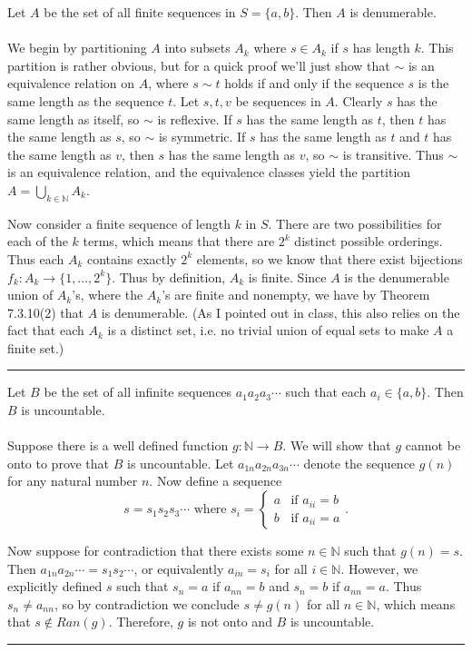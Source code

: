 \documentclass[11pt]{hmcpset}
\newenvironment{problem2}[1]{\noindent {\bf (#1}}
{\medskip}
\newenvironment{problem1}[1]{\noindent {\bf Problem #1}}
{\medskip}
\newenvironment{proof}{\noindent {\bf Proof:} \\}{\hfill
\rule{1mm}{3mm} \bigskip}
\begin{document}
\begin{problem1}{7 (a)} Let $A$ be the set of all finite sequences in $S=\{a,b\}$. Then $A$ is denumerable.\\
\begin{proof}\indent We begin by partitioning $A$ into subsets $A_k$ where $s\in A_k$ if $s$ has length $k$. This partition is rather obvious, but for a quick proof we'll just show that $\sim$ is an equivalence relation on $A$, where $s \sim t$ holds if and only if the sequence $s$ is the same length as the sequence $t$. Let $s,t,v$ be sequences in $A$. Clearly $s$ has the same length as itself, so $\sim$ is reflexive. If $s$ has the same length as $t$, then $t$ has the same length as $s$, so $\sim$ is symmetric. If $s$ has the same length as $t$ and $t$ has the same length as $v$, then $s$ has the same length as $v$, so $\sim$ is transitive. Thus $\sim$ is an equivalence relation, and the equivalence classes yield the partition $A=\bigcup_{k\in\mathbb{N}}A_k$.

Now consider a finite sequence of length $k$ in $S$. There are two possibilities for each of the $k$ terms, which means that there are $2^k$ distinct possible orderings. Thus each $A_k$ contains exactly $2^k$ elements, so we know that there exist bijections $f_k:A_k\to\{1,\ldots,2^k\}$. Thus by definition, $A_k$ is finite. Since $A$ is the denumerable union of $A_k$'s, where the $A_k$'s are finite and nonempty, we have by Theorem 7.3.10(2) that $A$ is denumerable. (As I pointed out in class, this also relies on the fact that each $A_k$ is a distinct set, i.e. no trivial union of equal sets to make $A$ a finite set.)
\end{proof}
\end{problem1}

\begin{problem2}{b)} Let $B$ be the set of all infinite sequences $a_1a_2a_3\cdots$ such that each $a_i\in \{a,b\}$. Then $B$ is uncountable.\\
\begin{proof}\indent Suppose there is a well defined function $g:\mathbb{N}\to B$. We will show that $g$ cannot be onto to prove that $B$ is uncountable. Let $a_{1n}a_{2n}a_{3n}\cdots$ denote the sequence $g(n)$ for any natural number $n$. Now define a sequence $$s=s_1s_2s_3\cdots\text{ where } s_i=\begin{cases}a & \text{if $a_{ii} = b$}\\ b & \text{if $a_{ii}=a$}\end{cases}.$$

Now suppose for contradiction that there exists some $n\in\mathbb{N}$ such that $g(n)=s$. Then $a_{1n}a_{2n}\cdots = s_1s_2\cdots$, or equivalently $a_{in}=s_i$ for all $i\in\mathbb{N}$. However, we explicitly defined $s$ such that $s_n=a$ if $a_{nn}=b$ and $s_n=b$ if $a_{nn}=a$. Thus $s_n\ne a_{nn}$, so by contradiction we conclude $s\ne g(n)$ for all $n\in\mathbb{N}$, which means that $s\notin Ran(g)$. Therefore, $g$ is not onto and $B$ is uncountable.
\end{proof}
\end{problem2}
\end{document}

